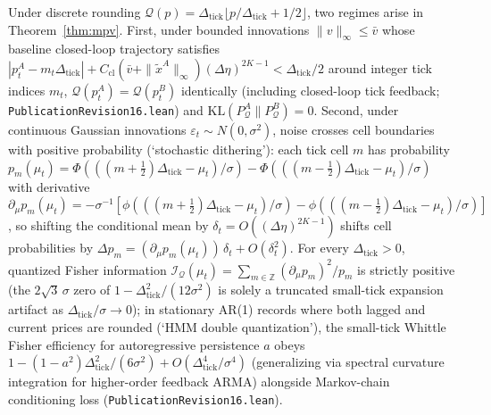 \documentclass[12pt]{article}
\theoremstyle{definition}
\theoremstyle{remark}
\newcommand{\KL}{\mathrm{KL}}
\begin{document}
Under discrete rounding $\mathcal{Q}(p) = \Delta_{\mathrm{tick}} \lfloor p / \Delta_{\mathrm{tick}} + 1/2 \rfloor$, two regimes arise in Theorem~\ref{thm:mpv}. First, under bounded innovations $\|v\|_\infty \le \bar{v}$ whose baseline closed-loop trajectory satisfies $|p_t^A - m_t \Delta_{\mathrm{tick}}| + C_{\mathrm{cl}}(\bar{v} + \|\tilde{x}^A\|_\infty) (\Delta\eta)^{2K-1} < \Delta_{\mathrm{tick}}/2$ around integer tick indices $m_t$, $\mathcal{Q}(p_t^A) = \mathcal{Q}(p_t^B)$ identically (including closed-loop tick feedback; \nolinkurl{PublicationRevision16.lean}) and $\KL(P_{\mathcal{Q}}^A \| P_{\mathcal{Q}}^B) = 0$. Second, under continuous Gaussian innovations $\varepsilon_t \sim N(0, \sigma^2)$, noise crosses cell boundaries with positive probability (`stochastic dithering'): each tick cell $m$ has probability $p_m(\mu_t) = \Phi(((m+\tfrac{1}{2})\Delta_{\mathrm{tick}} - \mu_t)/\sigma) - \Phi(((m-\tfrac{1}{2})\Delta_{\mathrm{tick}} - \mu_t)/\sigma)$ with derivative $\partial_{\mu} p_m(\mu_t) = -\sigma^{-1}[\phi(((m+\tfrac{1}{2})\Delta_{\mathrm{tick}} - \mu_t)/\sigma) - \phi(((m-\tfrac{1}{2})\Delta_{\mathrm{tick}} - \mu_t)/\sigma)]$, so shifting the conditional mean by $\delta_t = O((\Delta\eta)^{2K-1})$ shifts cell probabilities by $\Delta p_m = (\partial_\mu p_m(\mu_t))\,\delta_t + O(\delta_t^2)$. For every $\Delta_{\mathrm{tick}} > 0$, quantized Fisher information $\mathcal{I}_{\mathcal{Q}}(\mu_t) = \sum_{m\in\mathbb{Z}} (\partial_\mu p_m)^2 / p_m$ is strictly positive (the $2\sqrt{3}\,\sigma$ zero of $1 - \Delta_{\mathrm{tick}}^2/(12\sigma^2)$ is solely a truncated small-tick expansion artifact as $\Delta_{\mathrm{tick}}/\sigma \to 0$); in stationary AR(1) records where both lagged and current prices are rounded (`HMM double quantization'), the small-tick Whittle Fisher efficiency for autoregressive persistence $a$ obeys $1 - (1 - a^2)\Delta_{\mathrm{tick}}^2/(6\sigma^2) + O(\Delta_{\mathrm{tick}}^4/\sigma^4)$ (generalizing via spectral curvature integration for higher-order feedback ARMA) alongside Markov-chain conditioning loss (\nolinkurl{PublicationRevision16.lean}).
\end{document}
